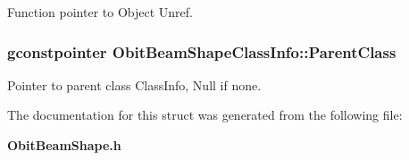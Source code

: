 Function pointer to Object Unref. 

\subsubsection{\setlength{\rightskip}{0pt plus 5cm}gconstpointer {\bf Obit\-Beam\-Shape\-Class\-Info::Parent\-Class}}\label{structObitBeamShapeClassInfo_o3}


Pointer to parent class Class\-Info, Null if none. 



The documentation for this struct was generated from the following file:\begin{CompactItemize}
\item 
{\bf Obit\-Beam\-Shape.h}\end{CompactItemize}
